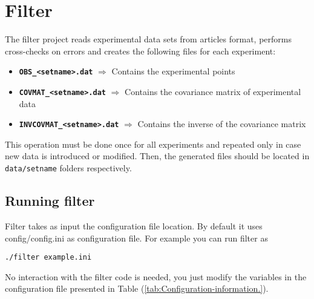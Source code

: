 
\section{Filter}

The filter project reads experimental data sets from articles format,
performs cross-checks on errors and creates the following files for
each experiment: 
\begin{itemize}
\item \texttt{\textbf{OBS\_<setname>.dat}} $\Rightarrow$ Contains the
experimental points 
\item \texttt{\textbf{COVMAT\_<setname>.dat}}\textbf{ }$\Rightarrow$ Contains
the covariance matrix of experimental data 
\item \texttt{\textbf{INVCOVMAT\_<setname>.dat}}\textbf{ }$\Rightarrow$
Contains the inverse of the covariance matrix 
\end{itemize}
This operation must be done once for all experiments and repeated
only in case new data is introduced or modified. Then, the generated
files should be located in \texttt{data/setname} folders respectively.

\subsection{Running filter}

Filter takes as input the configuration file location. By default
it uses config/config.ini as configuration file. For example you can
run filter as

\begin{lstlisting}
./filter example.ini
\end{lstlisting}


No interaction with the filter code is needed, you just modify the
variables in the configuration file presented in Table (\ref{tab:Configuration-information.}).

